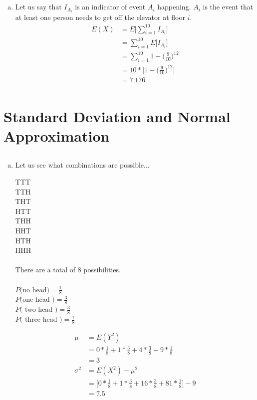 \documentclass[10pt]{report}
\begin{document}
 \subsection{}
 \begin{enumerate}[(a)]
 \item Let us say that $I_{A_i} $ is an indicator of event $A_i $ happening. $A_i $ is the event that at least one person needs to get off the elevator at floor $i$. 
 \begin{align*}
 E(X) &= E \bigg[ \sum_{i=1}^{10} {I_{A_i}} \bigg] \\
 &=  \sum_{i=1}^{10} {E[I_{A_i}}] \\
 &= \sum_{i=1}^{10} {1-\bigg(\frac{9}{10}\bigg)^{12}} \\
 &= 10* \bigg[1-\bigg(\frac{9}{10}\bigg)^{12}\bigg] \\
 &= 7.176 \\
 \end{align*}
 \end{enumerate}
  \section{\sc\color{cit}Standard Deviation and Normal Approximation}
   \setcounter{subsection}{1}
 \subsection{}
 \begin{enumerate}[(a)]
 \item Let us see what combinations are possible...
 \begin{center}
 TTT \\
 TTH \\
 THT \\
 HTT \\
 THH \\
 HHT \\
 HTH \\
 HHH \\
 \ \\
  There are a total of $8$ possibilities.  \\ 
  \ \\
  $P($no head$)= \frac{1}{8} $ \\
  $P($one head $) = \frac{3}{8} $ \\
  $P($ two head $) = \frac{3}{8}$ \\
  $P($ three head $) = \frac{1}{8}$ \\
 \end{center}
 \begin{align*}
 \mu &= E(Y^2) \\
 &= 0*\frac{1}{8} + 1*\frac{3}{8} + 4*\frac{3}{8} + 9*\frac{1}{8} \\
 &= 3 \\
 \sigma^2 &= E(X^2) - \mu ^2 \\
 &= \bigg[0*\frac{1}{8} + 1*\frac{3}{8} + 16*\frac{3}{8} + 81*\frac{1}{8}\bigg] - 9 \\
 &= 7.5
 \end{align*}
 \end{enumerate}
\end{document}
